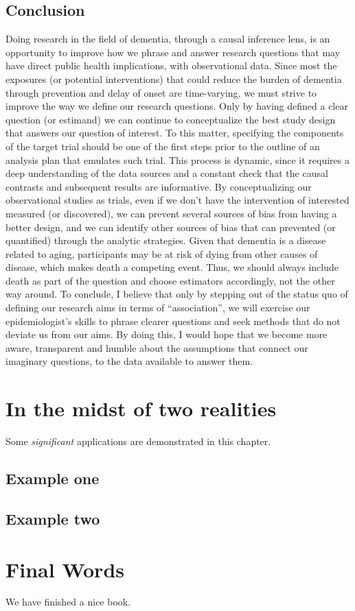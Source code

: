 \documentclass[
]{book}
\begin{document}
\hypertarget{conclusion}{%
\section{Conclusion}\label{conclusion}}

Doing research in the field of dementia, through a causal inference lens, is an opportunity to improve how we phrase and answer research questions that may have direct public health implications, with observational data. Since most the exposures (or potential interventions) that could reduce the burden of dementia through prevention and delay of onset are time-varying, we must strive to improve the way we define our research questions. Only by having defined a clear question (or estimand) we can continue to conceptualize the best study design that answers our question of interest. To this matter, specifying the components of the target trial should be one of the first steps prior to the outline of an analysis plan that emulates such trial. This process is dynamic, since it requires a deep understanding of the data sources and a constant check that the causal contrasts and subsequent results are informative. By conceptualizing our observational studies as trials, even if we don't have the intervention of interested measured (or discovered), we can prevent several sources of bias from having a better design, and we can identify other sources of bias that can prevented (or quantified) through the analytic strategies. Given that dementia is a disease related to aging, participants may be at risk of dying from other causes of disease, which makes death a competing event. Thus, we should always include death as part of the question and choose estimators accordingly, not the other way around. To conclude, I believe that only by stepping out of the status quo of defining our research aims in terms of ``association'', we will exercise our epidemiologist's skills to phrase clearer questions and seek methods that do not deviate us from our aims. By doing this, I would hope that we become more aware, transparent and humble about the assumptions that connect our imaginary questions, to the data available to answer them.

\hypertarget{chapter8}{%
\chapter{In the midst of two realities}\label{chapter8}}

Some \emph{significant} applications are demonstrated in this chapter.

\hypertarget{example-one-2}{%
\section{Example one}\label{example-one-2}}

\hypertarget{example-two-2}{%
\section{Example two}\label{example-two-2}}

\hypertarget{chapter10}{%
\chapter{Final Words}\label{chapter10}}

We have finished a nice book.

\printbibliography
\end{document}
